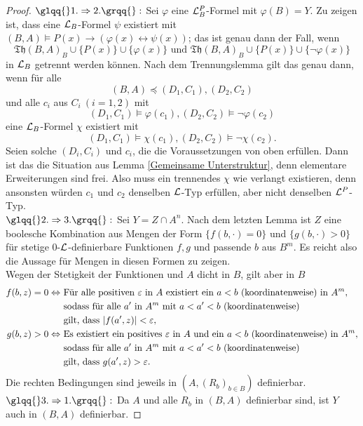 \begin{proof}
	$\glqq{}1.\Rightarrow 2.\grqq{}:$ Sei $\varphi$ eine $\mathcal{L}^P_B$-Formel mit $\varphi(B)=Y$. Zu zeigen ist, dass eine $\mathcal{L}_B$-Formel $\psi$ existiert mit $(B,A)\models P(x)\rightarrow(\varphi(x)\leftrightarrow\psi(x))$;
	 das ist genau dann der Fall, wenn $$\mathfrak{Th}(B,A)_B\cup\{P(x)\}\cup\{\varphi(x)\}\text{ und }\mathfrak{Th}(B,A)_B\cup\{P(x)\}\cup\{\neg\varphi(x)\}$$ in $\mathcal{L}_B$ getrennt werden können. Nach dem Trennungslemma gilt das genau dann, wenn für alle $$(B,A)\preceq(D_1,C_1),(D_2,C_2)$$ und alle $c_i$ aus $C_i\ (i=1,2)$ mit $$(D_1,C_1)\models\varphi(c_1),(D_2,C_2)\models\neg\varphi(c_2)$$ eine $\mathcal{L}_B$-Formel $\chi$ existiert mit $$(D_1,C_1)\models\chi(c_1),(D_2,C_2)\models\neg\chi(c_2).$$
	Seien solche $(D_i,C_i)$ und $c_i$, die die Voraussetzungen von oben erfüllen. Dann ist das die Situation aus Lemma \ref{Gemeinsame Unterstruktur}, denn elementare Erweiterungen sind frei. Also muss ein trennendes $\chi$ wie verlangt existieren, denn ansonsten würden $c_1$ und $c_2$ denselben $\mathcal{L}$-Typ erfüllen, aber nicht denselben $\mathcal{L}^P$-Typ.\\
	$\glqq{}2.\Rightarrow 3.\grqq{}:$ Sei $Y=Z\cap A^n$. Nach dem letzten Lemma ist $Z$ eine boolesche Kombination aus Mengen der Form $\{f(b,\cdot)=0\}$ und $\{g(b,\cdot)>0\}$ für stetige 0-$\mathcal{L}$-definierbare Funktionen $f,g$ und passende $b$ aus $B^m$. Es reicht also die Aussage für Mengen in diesen Formen zu zeigen.\\
	Wegen der Stetigkeit der Funktionen und $A$ dicht in $B$, gilt aber in $B$
	\begin{align*}
	f(b,z)=0\Leftrightarrow\ &\text{Für alle positiven }\varepsilon\text{ in }A\text{ existiert ein }a<b\text{ (koordinatenweise) in }A^m,\\&\text{sodass für alle }a'\text{ in }A^m\text{ mit }a<a'<b\text{ (koordinatenweise)}\\&\text{gilt, dass }{\left| f(a',z) \right|}<\varepsilon,\\
	g(b,z)>0\Leftrightarrow\ &\text{Es existiert ein positives }\varepsilon\text{ in }A\text{ und ein }a<b\text{ (koordinatenweise) in }A^m,\\&\text{sodass für alle }a'\text{ in }A^m\text{ mit }a<a'<b\text{ (koordinatenweise)}\\&\text{gilt, dass }g(a',z)>\varepsilon.
	\end{align*}
	Die rechten Bedingungen sind jeweils in $(A,(R_b)_{b\in B})$ definierbar.\\
	$\glqq{}3.\Rightarrow 1.\grqq{}:$ Da $A$ und alle $R_b$ in $(B,A)$ definierbar sind, ist $Y$ auch in $(B,A)$ definierbar.
\end{proof}

